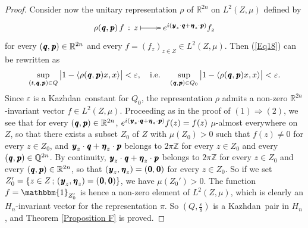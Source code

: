 \documentclass[11pt,english,a4paper]{smfart}
\numberwithin{equation}{section}
\theoremstyle{definition}
\begin{document}
\begin{proof}
 Consider now the unitary representation $\rho $ of ${\ensuremath{\mathbb R}}^{2n}$ on $L^{2}(Z,\mu )$ defined by 
\[
\xymatrix{
\rho ({\mkern 1.5 mu\pmb{q}},{\mkern 1.5 mu\pmb{p}})\,f\,:\,z\ar@{|->}[r]&e^{i({\mkern 1.5 mu\pmb{y}}_{z}\cdot{\mkern 1.5 mu\pmb{q}}+{\mkern 1.5 mu\pmb{\eta}} _{z}\cdot{\mkern 1.5 mu\pmb{p}})}f_z
}
\]
for every $({\mkern 1.5 mu\pmb{q}},{\mkern 1.5 mu\pmb{p}})\in{\ensuremath{\mathbb R}}^{2n}$ and every $f=(f_z)_{z\in Z}\in L^{2}(Z,\mu )$. Then (\ref{Eq18}) can be 
rewritten as 
\begin{align*}
 \sup_{(t,{\mkern 1.5 mu\pmb{q}},{\mkern 1.5 mu\pmb{p}})\in{Q}}\,\bigl|1-{\ensuremath{{\langle {\rho ({\mkern 1.5 mu\pmb{q}},{\mkern 1.5 mu\pmb{p}})x},{x}\rangle}}}\bigr|<\varepsilon,\quad\textrm{i.e.}\quad
\sup_{({\mkern 1.5 mu\pmb{q}},{\mkern 1.5 mu\pmb{p}})\in{Q}_{0}}\,\bigl|1-{\ensuremath{{\langle {\rho ({\mkern 1.5 mu\pmb{q}},{\mkern 1.5 mu\pmb{p}})x},{x}\rangle}}}\bigr|<\varepsilon.
\end{align*}
Since $\varepsilon $ is a {Kazhdan}\ constant for ${Q}_{0}$, the representation $\rho $ admits a non-zero ${\ensuremath{\mathbb R}}^{2n}$-invariant vector $f\in L^{2}(Z,\mu )$. Proceeding as in the proof of $(1)\Longrightarrow (2)$, we see that for every $({\mkern 1.5 mu\pmb{q}},{\mkern 1.5 mu\pmb{p}})\in{\ensuremath{\mathbb R}}^{2n}$, $e^{i({\mkern 1.5 mu\pmb{y}}_{z}\cdot{\mkern 1.5 mu\pmb{q}}+{\mkern 1.5 mu\pmb{\eta}} _{z}\cdot{\mkern 1.5 mu\pmb{p}})}f(z)=f(z)$ $\mu $-almost everywhere on $Z$, so that there exists a subset $Z_{0}$ of $Z$ with $\mu (Z_{0})>0$
such that $f(z)\neq 0$ for every $z\in Z_{0}$, and ${\mkern 1.5 mu\pmb{y}}_{z}\cdot{\mkern 1.5 mu\pmb{q}}+{\mkern 1.5 mu\pmb{\eta}} _{z}\cdot{\mkern 1.5 mu\pmb{p}}$ belongs to $2\pi {\ensuremath{\mathbb Z}}$ for every $z\in Z_{0}$ and every $({\mkern 1.5 mu\pmb{q}},{\mkern 1.5 mu\pmb{p}})\in {\ensuremath{\mathbb Q}}^{2n}$. By continuity, ${\mkern 1.5 mu\pmb{y}}_{z}\cdot{\mkern 1.5 mu\pmb{q}}+{\mkern 1.5 mu\pmb{\eta}} _{z}\cdot{\mkern 1.5 mu\pmb{p}}$ belongs to $2\pi {\ensuremath{\mathbb Z}}$ for every $z\in Z_{0}$ and every $({\mkern 1.5 mu\pmb{q}},{\mkern 1.5 mu\pmb{p}})\in{\ensuremath{\mathbb R}}^{2n}$, so that $({\mkern 1.5 mu\pmb{y}}_{z},{\mkern 1.5 mu\pmb{\eta}} _{z})=({\mkern 1.5 mu\pmb{0}},{\mkern 1.5 mu\pmb{0}})$ for every $z\in Z_{0}$. So if we set $Z_{0}'=\{z\in Z\,;\,({\mkern 1.5 mu\pmb{y}}_{z},{\mkern 1.5 mu\pmb{\eta}} _{z})=({\mkern 1.5 mu\pmb{0}},{\mkern 1.5 mu\pmb{0}})\}$, we have $\mu (Z_{0}')>0$. The function 
$f=\mathbbm{1}_{Z'_{0}}$ is hence a non-zero element of $L^{2}(Z,\mu )$, which is clearly an $H_{n}$-invariant vector for the representation $\pi $. So $({Q},\frac{\varepsilon }{8})$ is a {Kazhdan}\ pair in $H_{n}$, and Theorem \ref{Proposition F} is proved.
\end{proof}
\end{document}

